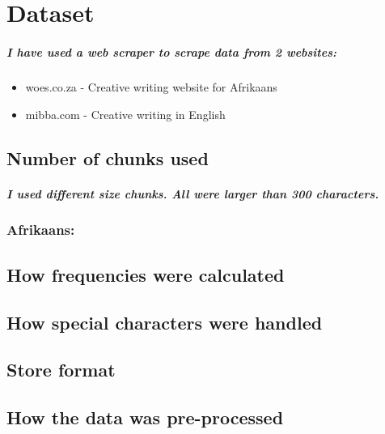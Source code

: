 \documentclass[pdftex,10pt,a4paper]{report}
\begin{document}


\newpage


\newpage
{}

\tableofcontents 

\newpage
{}

\begingroup
\renewcommand{\cleardoublepage}{}
\renewcommand{\clearpage}{}
\chapter{Dataset}
\paragraph{I have used a web scraper to scrape data from 2 websites:}
\begin{itemize}
	\item{woes.co.za - Creative writing website for Afrikaans}
	\item{mibba.com - Creative writing in English}
\end{itemize}
\section{Number of chunks used}
\paragraph{I used different size chunks. All were larger than 300 characters. }	
\subsection{Afrikaans: }	
\section{How frequencies were calculated}
\section{How special characters were handled}
\section{Store format}
\section{How the data was pre-processed}


				
\endgroup
	
\end{document}
